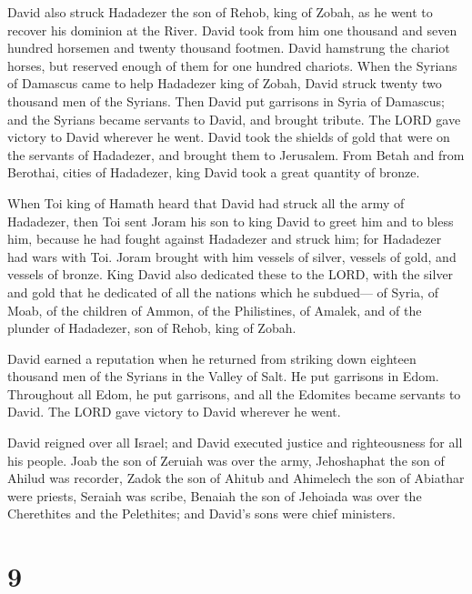  David also struck Hadadezer the son of Rehob, king of
Zobah, as he went to recover his dominion at the River. 
David took from him one thousand and seven hundred horsemen and twenty
thousand footmen. David hamstrung the chariot horses, but reserved
enough of them for one hundred chariots.  When the Syrians
of Damascus came to help Hadadezer king of Zobah, David struck twenty
two thousand men of the Syrians.  Then David put garrisons
in Syria of Damascus; and the Syrians became servants to David, and
brought tribute. The LORD gave victory to David wherever he went.
 David took the shields of gold that were on the servants of
Hadadezer, and brought them to Jerusalem.  From Betah and
from Berothai, cities of Hadadezer, king David took a great quantity of
bronze.

 When Toi king of Hamath heard that David had struck all the
army of Hadadezer,  then Toi sent Joram his son to king
David to greet him and to bless him, because he had fought against
Hadadezer and struck him; for Hadadezer had wars with Toi. Joram brought
with him vessels of silver, vessels of gold, and vessels of bronze.
 King David also dedicated these to the LORD, with the
silver and gold that he dedicated of all the nations which he subdued---
 of Syria, of Moab, of the children of Ammon, of the
Philistines, of Amalek, and of the plunder of Hadadezer, son of Rehob,
king of Zobah.

 David earned a reputation when he returned from striking
down eighteen thousand men of the Syrians in the Valley of Salt.
 He put garrisons in Edom. Throughout all Edom, he put
garrisons, and all the Edomites became servants to David. The LORD gave
victory to David wherever he went.

 David reigned over all Israel; and David executed justice
and righteousness for all his people.  Joab the son of
Zeruiah was over the army, Jehoshaphat the son of Ahilud was recorder,
 Zadok the son of Ahitub and Ahimelech the son of Abiathar
were priests, Seraiah was scribe,  Benaiah the son of
Jehoiada was over the Cherethites and the Pelethites; and David's sons
were chief ministers.

\hypertarget{section-8}{%
\section{9}\label{section-8}}

